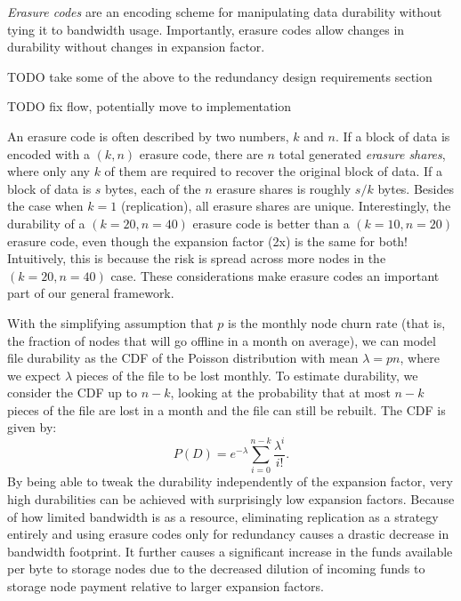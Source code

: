 \documentclass[11pt,fleqn,openany]{book}
\newcommand{\todo}[1]{{\color{red} TODO #1 }}
\begin{document}
{\em Erasure codes} are an encoding scheme for manipulating
data durability without tying it to bandwidth usage. Importantly, erasure
codes allow changes in durability without changes in expansion factor.

\todo{take some of the above to the redundancy design requirements section}

\todo{fix flow, potentially move to implementation

An erasure code is often described by two numbers, $k$ and $n$. If a block of
data is encoded with a $(k,n)$ erasure code, there are $n$ total generated {\em
erasure shares}, where only any $k$ of them are required to recover the original
block of data. If a block of data is $s$ bytes, each of the $n$ erasure shares
is roughly $s/k$ bytes. Besides the case when $k=1$ (replication), all erasure
shares are unique. Interestingly, the durability of a $(k=20,n=40)$ erasure code
is better than a $(k=10,n=20)$ erasure code, even though the expansion factor
(2x) is the same for both! Intuitively, this is because the risk is spread
across more nodes in the $(k=20,n=40)$ case. These considerations make erasure
codes an important part of our general framework.

With the simplifying assumption that $p$ is the monthly node
churn rate (that is, the fraction of nodes that will go offline in a month on
average), we can model file durability
as the CDF of the Poisson distribution with mean $\lambda=pn$,
where we expect $\lambda$ pieces of the file to be lost monthly. To estimate
durability, we consider the CDF up to $n-k$,
looking at the probability that at most $n-k$ pieces
of the file are lost in a month and the file can still be rebuilt.
The CDF is given by:
\begin{equation}
P(D) = e^{-\lambda} \sum_{i=0}^{n-k} \frac{\lambda^i}{i!}.
\label{eq:poiss_cdf}
\end{equation}
By being able to tweak the durability independently of the expansion factor,
very high durabilities can be achieved with surprisingly low expansion factors.
Because of how limited bandwidth is as a resource, eliminating replication as a
strategy entirely and using erasure codes only for redundancy causes a drastic
decrease in bandwidth footprint.
It further causes a significant increase in the funds available per byte to
storage nodes due to the decreased dilution of incoming funds to storage node
payment relative to larger expansion factors.

}
\end{document}
